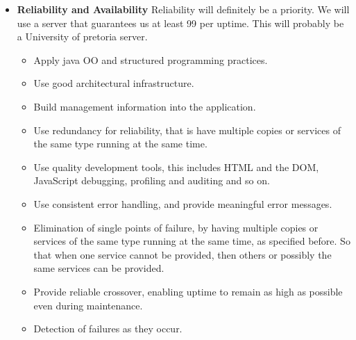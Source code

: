\begin{itemize}
\begin{itemize}
		\end{itemize}
	\item \textbf{Reliability and Availability}
		Reliability will definitely be a priority. We will use a server that guarantees us at least 99 per uptime. This will probably be a University of pretoria server.
		\begin{itemize}
			\item Apply java OO and structured programming practices.
			\item Use good architectural infrastructure.
			\item Build management information into the application.
			\item Use redundancy for reliability, that is have multiple copies or services of the same type running at the same time.
			\item Use quality development tools, this includes HTML and the DOM, JavaScript debugging, profiling and auditing and so on.
			\item Use consistent error handling, and provide meaningful error messages.
			\item Elimination of single points of failure, by having multiple copies or services of the same type running at the same time, as specified before. So that when one service cannot be provided, then others or possibly the same services can be provided.
			\item Provide reliable crossover, enabling uptime to remain as high as possible even during maintenance.
			\item Detection of failures as they occur.
		\end{itemize}
		

\end{itemize}
